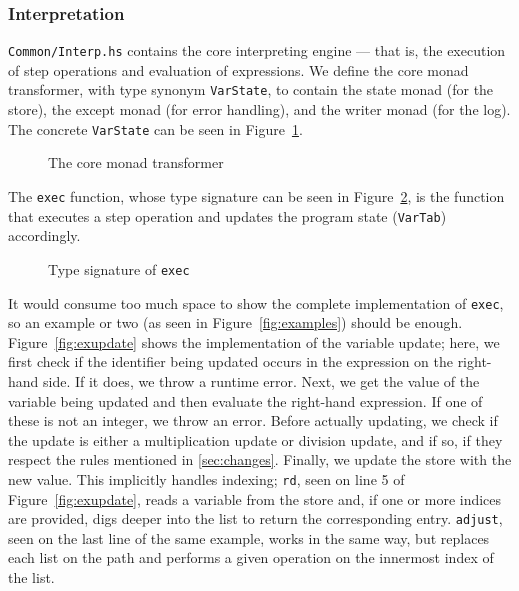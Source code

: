 \subsubsection{Interpretation}
\texttt{Common/Interp.hs} contains the core interpreting engine --- that is, the execution of step operations and evaluation of expressions. We define the core monad transformer, with type synonym \texttt{VarState}, to contain the state monad (for the store), the except monad (for error handling), and the writer monad (for the log). The concrete \texttt{VarState} can be seen in Figure~\ref{fig:varstate}.

\begin{figure}[H]
  
  \caption{The core monad transformer}\label{fig:varstate}
\end{figure}

\noindent The \texttt{exec} function, whose type signature can be seen in Figure~\ref{fig:exec}, is the function that executes a step operation and updates the program state (\texttt{VarTab}) accordingly.

\begin{figure}[H]
  
  \caption{Type signature of \texttt{exec}}\label{fig:exec}
\end{figure}

\noindent It would consume too much space to show the complete implementation of \texttt{exec}, so an example or two (as seen in Figure~\ref{fig:examples}) should be enough. Figure~\ref{fig:exupdate} shows the implementation of the variable update; here, we first check if the identifier being updated occurs in the expression on the right-hand side. If it does, we throw a runtime error. Next, we get the value of the variable being updated and then evaluate the right-hand expression. If one of these is not an integer, we throw an error. Before actually updating, we check if the update is either a multiplication update or division update, and if so, if they respect the rules mentioned in \ref{sec:changes}. Finally, we update the store with the new value. This implicitly handles indexing; \texttt{rd}, seen on line 5 of Figure~\ref{fig:exupdate}, reads a variable from the store and, if one or more indices are provided, digs deeper into the list to return the corresponding entry. \texttt{adjust}, seen on the last line of the same example, works in the same way, but replaces each list on the path and performs a given operation on the innermost index of the list.

